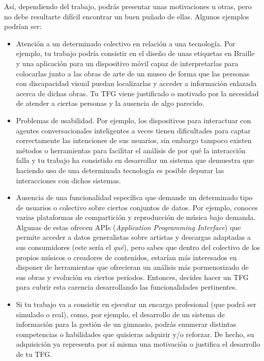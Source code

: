 Así, dependiendo del trabajo, podrás presentar unas motivaciones u otras, pero no debe resultarte difícil encontrar un buen puñado de ellas. Algunos ejemplos podrían ser: 

\begin{itemize}
  \item Atención a un determinado colectivo en relación a una tecnología. Por ejemplo, tu trabajo podría consistir en el diseño de unas etiquetas en Braille y una aplicación para un dispositivo móvil capaz de interpretarlas para colocarlas junto a las obras de arte de un museo de forma que las personas con discapacidad visual puedan localizarlas y acceder a información enlazada acerca de dichas obras. Tu TFG viene justificado o motivado por la necesidad de atender a ciertas personas y la ausencia de algo parecido.
  \item Problemas de usabilidad. Por ejemplo, los dispositivos para interactuar con agentes conversacionales inteligentes a veces tienen dificultades para captar correctamente las intenciones de sus usuarios, sin embargo tampoco existen métodos o herramientas para facilitar el análisis de por qué la interacción falla y tu trabajo ha consistido en desarrollar un sistema que demuestra que haciendo uso de una determinada tecnología es posible depurar las interacciones con dichos sistemas.
  \item Ausencia de una funcionalidad específica que demande un determinado tipo de usuarios o colectivo sobre ciertos conjuntos de datos. Por ejemplo, conoces varias plataformas de compartición y reproducción de música bajo demanda. Algunas de estas ofrecen APIs (\textit{Application Programming Interface}) que permite acceder a datos generalistas sobre artistas y descargas adaptadas a sus consumidores (este sería el \textit{qué}), pero sabes que dentro del colectivo de los propios músicos o creadores de contenidos, estarían más interesados en disponer de herramientas que ofrecieran un análisis más pormenorizado de sus obras y evolución en ciertos períodos. Entonces, decides hacer un TFG para cubrir esta carencia desarrollando las funcionalidades pertinentes.
  \item Si tu trabajo va a consistir en ejecutar un encargo profesional (que podrá ser simulado o real), como, por ejemplo, el desarrollo de un sistema de información para la gestión de un gimnasio, podrás enumerar distintas competencias o habilidades que quisieras adquirir y/o reforzar. De hecho, su adquisición ya representa por sí misma una motivación o justifica el desarrollo de tu TFG.
\end{itemize}

